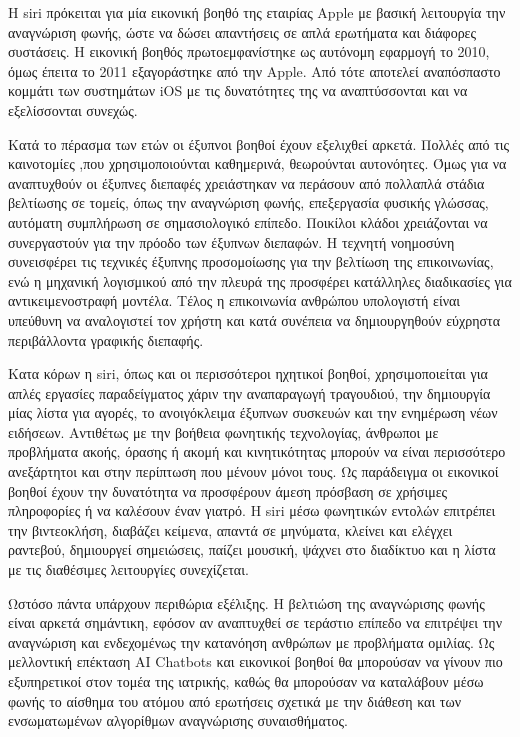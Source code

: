 \documentclass[
]{article}
\begin{document}
Η siri πρόκειται για μία εικονική βοηθό της εταιρίας Apple με βασική
λειτουργία την αναγνώριση φωνής, ώστε να δώσει απαντήσεις σε απλά
ερωτήματα και διάφορες συστάσεις. Η εικονική βοηθός πρωτοεμφανίστηκε ως
αυτόνομη εφαρμογή το 2010, όμως έπειτα το 2011 εξαγοράστηκε από την
Apple. Από τότε αποτελεί αναπόσπαστο κομμάτι των συστημάτων iOS με τις
δυνατότητες της να αναπτύσσονται και να εξελίσσονται συνεχώς.

Κατά το πέρασμα των ετών οι έξυπνοι βοηθοί έχουν εξελιχθεί αρκετά.
Πολλές από τις καινοτομίες ,που χρησιμοποιούνται καθημερινά, θεωρούνται
αυτονόητες. Όμως για να αναπτυχθούν οι έξυπνες διεπαφές χρειάστηκαν να
περάσουν από πολλαπλά στάδια βελτίωσης σε τομείς, όπως την αναγνώριση
φωνής, επεξεργασία φυσικής γλώσσας, αυτόματη συμπλήρωση σε σημασιολογικό
επίπεδο. Ποικίλοι κλάδοι χρειάζονται να συνεργαστούν για την πρόοδο των
έξυπνων διεπαφών. Η τεχνητή νοημοσύνη συνεισφέρει τις τεχνικές έξυπνης
προσομοίωσης για την βελτίωση της επικοινωνίας, ενώ η μηχανική
λογισμικού από την πλευρά της προσφέρει κατάλληλες διαδικασίες για
αντικειμενοστραφή μοντέλα. Τέλος η επικοινωνία ανθρώπου υπολογιστή είναι
υπεύθυνη να αναλογιστεί τον χρήστη και κατά συνέπεια να δημιουργηθούν
εύχρηστα περιβάλλοντα γραφικής διεπαφής.

Κατα κόρων η siri, όπως και οι περισσότεροι ηχητικοί βοηθοί,
χρησιμοποιείται για απλές εργασίες παραδείγματος χάριν την αναπαραγωγή
τραγουδιού, την δημιουργία μίας λίστα για αγορές, το ανοιγόκλειμα
έξυπνων συσκευών και την ενημέρωση νέων ειδήσεων. Αντιθέτως με την
βοήθεια φωνητικής τεχνολογίας, άνθρωποι με προβλήματα ακοής, όρασης ή
ακομή και κινητικότητας μπορούν να είναι περισσότερο ανεξάρτητοι και
στην περίπτωση που μένουν μόνοι τους. Ως παράδειγμα οι εικονικοί βοηθοί
έχουν την δυνατότητα να προσφέρουν άμεση πρόσβαση σε χρήσιμες
πληροφορίες ή να καλέσουν έναν γιατρό. Η siri μέσω φωνητικών εντολών
επιτρέπει την βιντεοκλήση, διαβάζει κείμενα, απαντά σε μηνύματα, κλείνει
και ελέγχει ραντεβού, δημιουργεί σημειώσεις, παίζει μουσική, ψάχνει στο
διαδίκτυο και η λίστα με τις διαθέσιμες λειτουργίες συνεχίζεται.

Ωστόσο πάντα υπάρχουν περιθώρια εξέλιξης. Η βελτιώση της αναγνώρισης
φωνής είναι αρκετά σημάντικη, εφόσον αν αναπτυχθεί σε τεράστιο επίπεδο
να επιτρέψει την αναγνώριση και ενδεχομένως την κατανόηση ανθρώπων με
προβλήματα ομιλίας. Ως μελλοντική επέκταση AI Chatbots και εικονικοί
βοηθοί θα μπορούσαν να γίνουν πιο εξυπηρετικοί στον τομέα της ιατρικής,
καθώς θα μπορούσαν να καταλάβουν μέσω φωνής το αίσθημα του ατόμου από
ερωτήσεις σχετικά με την διάθεση και των ενσωματωμένων αλγορίθμων
αναγνώρισης συναισθήματος.
\end{document}
